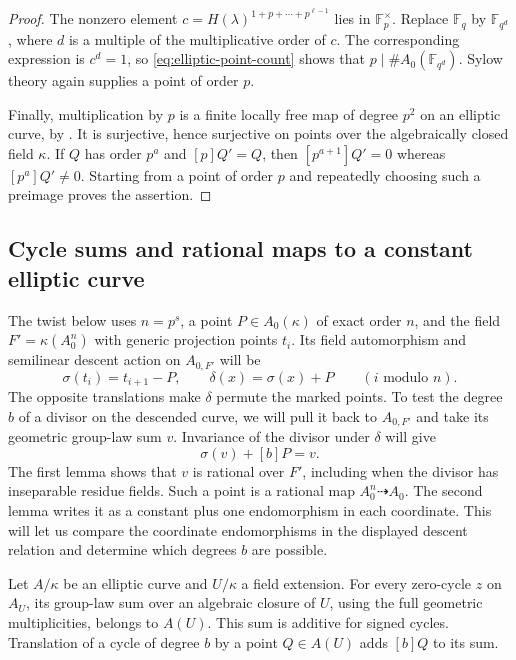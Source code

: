 \begin{proof}
The nonzero element
$c=H(\lambda)^{1+p+\cdots+p^{\ell-1}}$ lies in
$\mathbb F_p^\times$.  Replace $\mathbb F_q$ by
$\mathbb F_{q^d}$, where $d$ is a multiple of the multiplicative order
of $c$.  The corresponding expression is $c^d=1$, so
\eqref{eq:elliptic-point-count} shows that
$p\mid\#A_0(\mathbb F_{q^d})$.  Sylow theory again supplies a point
of order $p$.

Finally, multiplication by $p$ is a finite locally free map of degree
$p^2$ on an elliptic curve, by .  It is
surjective, hence surjective on points over the algebraically closed
field $\kappa$.  If $Q$ has order $p^a$ and $[p]Q'=Q$, then
$[p^{a+1}]Q'=0$ whereas $[p^a]Q'\ne0$.  Starting from a point of
order $p$ and repeatedly choosing such a preimage proves the assertion.
\end{proof}

\subsection{Cycle sums and rational maps to a constant elliptic curve}

The twist below uses $n=p^s$, a point $P\in A_0(\kappa)$ of exact
order $n$, and the field $F'=\kappa(A_0^n)$ with generic projection
points $t_i$. Its field automorphism and semilinear descent action
on $A_{0,F'}$ will be
\[
 \sigma(t_i)=t_{i+1}-P,\qquad \delta(x)=\sigma(x)+P
 \qquad(i\text{ modulo }n).
\]
The opposite translations make $\delta$ permute the marked points.
To test the degree $b$ of a divisor on the descended curve, we will
pull it back to $A_{0,F'}$ and take its geometric group-law sum $v$.
Invariance of the divisor under $\delta$ will give
\[
                         \sigma(v)+[b]P=v.
\]
The first lemma shows that $v$ is rational over $F'$, including when
the divisor has inseparable residue fields. Such a point is a rational
map $A_0^n\dashrightarrow A_0$. The second lemma writes it as a
constant plus one endomorphism in each coordinate. This will let us
compare the coordinate endomorphisms in the displayed descent relation
and determine which degrees $b$ are possible.

\begin{lemma}\label{lem:cycle-sum-rationality}
Let $A/\kappa$ be an elliptic curve and $U/\kappa$ a field extension.
For every zero-cycle $z$ on $A_U$, its group-law sum over an algebraic
closure of $U$, using the full geometric multiplicities, belongs to
$A(U)$.  This sum is additive for signed cycles.  Translation of a
cycle of degree $b$ by a point $Q\in A(U)$ adds $[b]Q$ to its sum.
\end{lemma}

